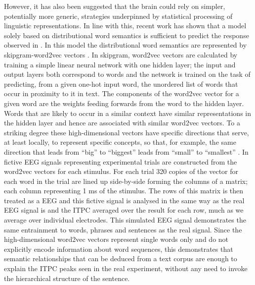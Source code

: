 \documentclass[10pt,letterpaper]{article}
\newcommand{\citet}[1]{\cite{#1}}
\begin{document}
However, it has also been suggested that the brain could rely on simpler, potentially more generic, strategies underpinned by statistical processing of linguistic representations. In line with this, recent work \cite{FrankYang2018} has shown that a model solely based on distributional word semantics is sufficient to predict the response observed in \cite{DingEtAl2016, DingEtAl2017}. In this model the distributional word semantics are represented by skipgram-word2vec vectors \cite{MikolovEtAl2013,Bojanowski2017}. In skipgram, word2vec vectors are calculated by training a simple linear neural network with one hidden layer; the input and output layers both correspond to words and the network is trained on the task of predicting, from a given one-hot input word, the unordered list of words that occur in proximity to it in text. The components of the word2vec vector for a given word are the weights feeding forwards from the word to the hidden layer. Words that are likely to occur in a similar context have similar representations in the hidden layer and hence are associated with similar word2vec vectors. To a striking degree these high-dimensional vectors have specific directions that serve, at least locally, to represent specific concepts, so that, for example, the same direction that leads from ``big'' to ``biggest'' leads from ``small'' to ``smallest'' \cite{MikolovEtAl2013b, MikolovEtAl2013c}. In \citet{FrankYang2018} fictive EEG signals representing experimental trials are constructed from the word2vec vectors for each stimulus. For each trial 320 copies of the vector for each word in the trial are lined up side-by-side forming the columns of a matrix; each column representing 1 ms of the stimulus. The rows of this matrix is then treated as a EEG and this fictive signal is analysed in the same way as the real EEG signal is and the ITPC averaged over the result for each row, much as we average over individual electrodes. This simulated EEG signal demonstrates the same entrainment to words, phrases and sentences as the real signal. Since the high-dimensional word2vec vectors represent single words only and do not explicitly encode information about word sequences, this demonstrates that semantic relationships that can be deduced from a text corpus are enough to explain the ITPC peaks seen in the real experiment, without any need to invoke the hierarchical structure of the sentence.
\end{document}
